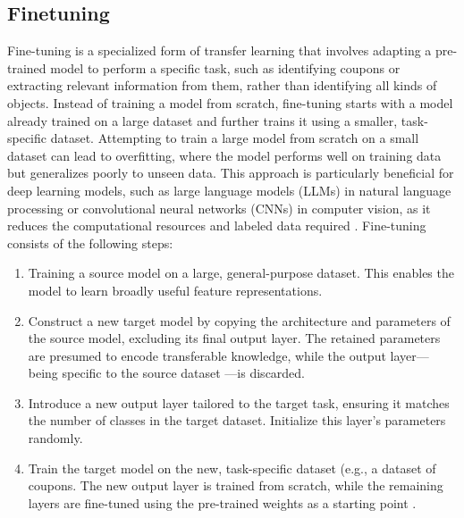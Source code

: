 \documentclass[licencjacka,en]{pracamgr}
\begin{document}
\subsection{Finetuning}
Fine-tuning is a specialized form of transfer learning that involves adapting a pre-trained model to perform a specific task, such as identifying coupons or extracting relevant information from them, rather than identifying all kinds of objects. Instead of training a model from scratch, fine-tuning starts with a model already trained on a large dataset and further trains it using a smaller, task-specific dataset. Attempting to train a large model from scratch on a small dataset can lead to overfitting, where the model performs well on training data but generalizes poorly to unseen data. This approach is particularly beneficial for deep learning models, such as large language models (LLMs) in natural language processing or convolutional neural networks (CNNs) in computer vision, as it reduces the computational resources and labeled data required \cite{ibm_finetuning}.
Fine-tuning consists of the following steps:
\begin{enumerate}
	\item Training a source model on a large, general-purpose dataset. This enables the model to learn broadly useful feature representations.
	\item Construct a new target model by copying the architecture and parameters of the source model, excluding its final output layer. The retained parameters are presumed to encode transferable knowledge, while the output layer—being specific to the source dataset —is discarded.
	\item Introduce a new output layer tailored to the target task, ensuring it matches the number of classes in the target dataset. Initialize this layer’s parameters randomly.
	\item Train the target model on the new, task-specific dataset (e.g., a dataset of coupons. The new output layer is trained from scratch, while the remaining layers are fine-tuned using the pre-trained weights as a starting point \cite{finetune_cool_image}.
\end{enumerate}


\end{document}
